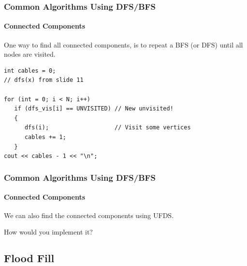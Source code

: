 \documentclass{beamer}
\begin{document}
\begin{frame}[fragile]
  \frametitle{Common Algorithms Using DFS/BFS}
  \framesubtitle{Connected Components}

  {\smaller
    One way to find all connected components, is to repeat
    a BFS (or DFS) until all nodes are visited.

    \begin{exampleblock}{}
\begin{verbatim}
int cables = 0;
// dfs(x) from slide 11

for (int = 0; i < N; i++)
   if (dfs_vis[i] == UNVISITED) // New unvisited!
   {
      dfs(i);                   // Visit some vertices
      cables += 1;
   }
cout << cables - 1 << "\n";
\end{verbatim}
    \end{exampleblock}}

\begin{center}
\end{center}
\end{frame}

\begin{frame}
  \frametitle{Common Algorithms Using DFS/BFS}
  \framesubtitle{Connected Components}

  We can also find the connected components using \alert{UFDS}.

  \bigskip

  How would you implement it?
\end{frame}

\subsection{Flood Fill}
\end{document}
